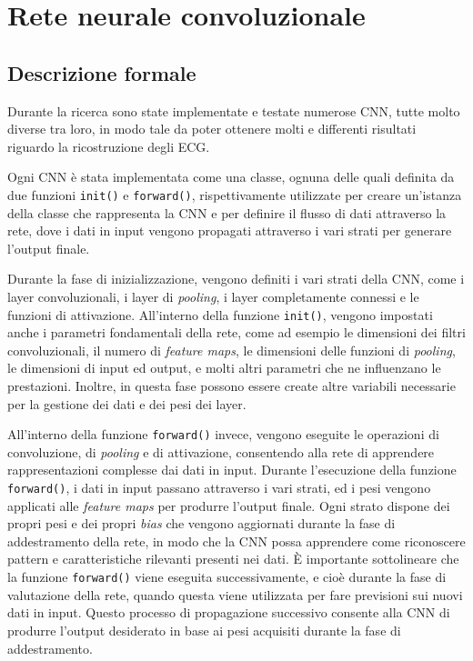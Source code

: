 \documentclass[12pt,italian]{report}
\begin{document}
\section{Rete neurale convoluzionale}
\label{sec:network}

\subsection{Descrizione formale}
\label{subsec:descrizione}

Durante la ricerca sono state implementate e testate numerose CNN, tutte molto diverse tra loro, in modo tale da poter ottenere molti e differenti risultati riguardo la ricostruzione degli ECG.

Ogni CNN è stata implementata come una classe, ognuna delle quali definita da due funzioni \texttt{init()} e \texttt{forward()}, rispettivamente utilizzate per creare un'istanza della classe che rappresenta la CNN e per definire il flusso di dati attraverso la rete, dove i dati in input vengono propagati attraverso i vari strati per generare l'output finale.

Durante la fase di inizializzazione, vengono definiti i vari strati della CNN, come i layer convoluzionali, i layer di \textit{pooling}, i layer completamente connessi e le funzioni di attivazione. All'interno della funzione \texttt{init()}, vengono impostati anche i parametri fondamentali della rete, come ad esempio le dimensioni dei filtri convoluzionali, il numero di \textit{feature maps}, le dimensioni delle funzioni di \textit{pooling}, le dimensioni di input ed output, e molti altri parametri che ne influenzano le prestazioni. Inoltre, in questa fase possono essere create altre variabili necessarie per la gestione dei dati e dei pesi dei layer.

All'interno della funzione \texttt{forward()} invece, vengono eseguite le operazioni di convoluzione, di \textit{pooling} e di attivazione, consentendo alla rete di apprendere rappresentazioni complesse dai dati in input. Durante l'esecuzione della funzione \texttt{forward()}, i dati in input passano attraverso i vari strati, ed i pesi vengono applicati alle \textit{feature maps} per produrre l'output finale. Ogni strato dispone dei propri pesi e dei propri \textit{bias} che vengono aggiornati durante la fase di addestramento della rete, in modo che la CNN possa apprendere come riconoscere pattern e caratteristiche rilevanti presenti nei dati. È importante sottolineare che la funzione \texttt{forward()} viene eseguita successivamente, e cioè durante la fase di valutazione della rete, quando questa viene utilizzata per fare previsioni sui nuovi dati in input. Questo processo di propagazione successivo consente alla CNN di produrre l'output desiderato in base ai pesi acquisiti durante la fase di addestramento.
\end{document}
